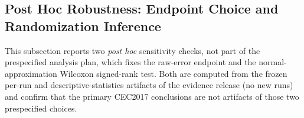 \documentclass[algorithms,article,submit,moreauthors,pdftex]{Definitions/mdpi}
\newcommand{\dtgsk}{DT-GSK}
\newcommand{\apgsk}{APGSK}
\newcommand{\egsk}{eGSK}
\begin{document}
\begin{table}[H]
\caption{$95\%$ bootstrap BCa descriptive rank-stability intervals on the CEC2017
Friedman mean ranks of the seven-algorithm GSK-family panel (per dimension;
29 function-level midranks resampled, $n_{\text{boot}} = 10{,}000$,
seeded with base seed $20{,}260{,}422$); point estimates reproduce the
main-text Friedman rank table exactly at 2-decimal display.  Lower is
better.  Rank orderings between comparators are not fully robust under
the prespecified r01/r04 robustness variants, and \dtgsk{} and
\egsk{} are never Nemenyi-separable ($\mathrm{CD} = 1.673$).  \apgsk{}
columns at $D = 10$--$50$ rest on the disclosed per-generation-log
evidence basis.  }\label{tab:bca-ci}
\centering
\tablesize{\footnotesize}

\end{table}

\subsection{Post Hoc Robustness: Endpoint Choice and Randomization Inference}\label{sec:supp:posthoc}

This subsection reports two \emph{post hoc} sensitivity checks, not part of
the prespecified analysis plan, which fixes the raw-error endpoint and the
normal-approximation Wilcoxon signed-rank test.  Both are computed from the
frozen per-run and descriptive-statistics artifacts of the evidence release (no
new runs) and confirm that the primary CEC2017 conclusions are not artifacts of
those two prespecified choices.
\end{document}
